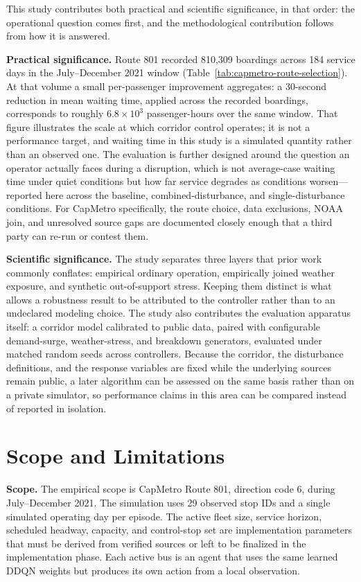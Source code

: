 This study contributes both practical and scientific significance, in that order: the operational question comes first, and the methodological contribution follows from how it is answered.

\textbf{Practical significance.} Route 801 recorded 810{,}309 boardings across 184 service days in the July--December 2021 window (Table~\ref{tab:capmetro-route-selection}). At that volume a small per-passenger improvement aggregates: a 30-second reduction in mean waiting time, applied across the recorded boardings, corresponds to roughly $6.8\times10^{3}$ passenger-hours over the same window. That figure illustrates the scale at which corridor control operates; it is not a performance target, and waiting time in this study is a simulated quantity rather than an observed one. The evaluation is further designed around the question an operator actually faces during a disruption, which is not average-case waiting time under quiet conditions but how far service degrades as conditions worsen---reported here across the baseline, combined-disturbance, and single-disturbance conditions. For CapMetro specifically, the route choice, data exclusions, NOAA join, and unresolved source gaps are documented closely enough that a third party can re-run or contest them.

\textbf{Scientific significance.} The study separates three layers that prior work commonly conflates: empirical ordinary operation, empirically joined weather exposure, and synthetic out-of-support stress. Keeping them distinct is what allows a robustness result to be attributed to the controller rather than to an undeclared modeling choice. The study also contributes the evaluation apparatus itself: a corridor model calibrated to public data, paired with configurable demand-surge, weather-stress, and breakdown generators, evaluated under matched random seeds across controllers. Because the corridor, the disturbance definitions, and the response variables are fixed while the underlying sources remain public, a later algorithm can be assessed on the same basis rather than on a private simulator, so performance claims in this area can be compared instead of reported in isolation.

\section{Scope and Limitations}\label{sec:scope}

\textbf{Scope.} The empirical scope is CapMetro Route 801, direction code 6, during July--December 2021. The simulation uses 29 observed stop IDs and a single simulated operating day per episode. The active fleet size, service horizon, scheduled headway, capacity, and control-stop set are implementation parameters that must be derived from verified sources or left to be finalized in the implementation phase. Each active bus is an agent that uses the same learned DDQN weights but produces its own action from a local observation.


